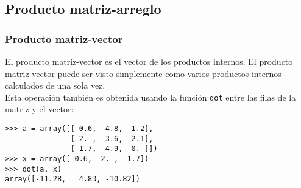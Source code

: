\subsection{Producto matriz-arreglo}
\begin{frame}[fragile]
\frametitle{Producto matriz-vector}
El producto matriz-vector es el vector de los productos internos. El producto matriz-vector puede ser visto simplemente como varios productos internos calculados de una sola vez.
\\
\bigskip
Esta operación también es obtenida usando la función \texttt{dot} entre las filas de la matriz y el vector:
\fontsize{12}{12}\selectfont
\begin{exampleblock}{}
\verb|>>> a = array([[-0.6,  4.8, -1.2],| \\
\verb|               [-2. , -3.6, -2.1],| \\
\verb|               [ 1.7,  4.9,  0. ]])| \\
\verb|>>> x = array([-0.6, -2. ,  1.7])| \\
\pause
\verb|>>> dot(a, x)| \\
\pause
\verb|array([-11.28,   4.83, -10.82])|
\end{exampleblock}
\end{frame}
